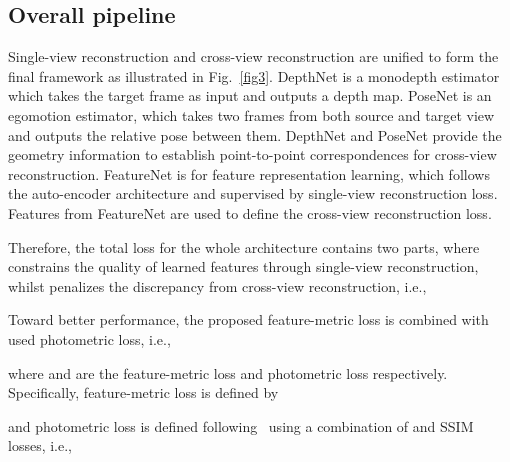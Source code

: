 \documentclass[runningheads]{llncs}
\begin{document}
\subsection{Overall pipeline}\label{sec34}
Single-view reconstruction and cross-view reconstruction are unified to form the final framework as illustrated in Fig.~\ref{fig3}. DepthNet is a monodepth estimator which takes the target frame as input and outputs a depth map. PoseNet is an egomotion estimator, which takes two frames from both source and target view and outputs the relative pose between them. DepthNet and PoseNet provide the geometry information to establish point-to-point correspondences for cross-view reconstruction. FeatureNet is for feature representation learning, which follows the auto-encoder architecture and supervised by single-view reconstruction loss. Features from FeatureNet are used to define the cross-view reconstruction loss.   

\iffalse
Single-view reconstruction and cross-view reconstruction are unified to form our final framework. 
Fig. \ref{fig3} shows an illustration of the overall process. 
The PoseNet is a pose estimator, which receives concatenation of two frames respectively from the source and target views and outputs the relative pose between them.
The DepthNet is a depth estimator, which takes the frame at the target view as input and outputs corresponding depth map. 
The FeatureNet is a network of auto-encoder architecture, we used for single-view reconstruction.
Its training is constrained by the single-view reconstruction loss to make sure feature maps from its encoder have promised properties.
During the training, the feature map extracted from the frame at the source view are warped to target view according to the depth and egomotion estimated by DepthNet and PoseNet.
The discrepancy between the synthesized feature map and target feature map will be evaluated as the feature-metric loss.
\fi


Therefore, the total loss for the whole architecture contains two parts, where  constrains the quality of learned features through single-view reconstruction, whilst  penalizes the discrepancy from cross-view reconstruction, i.e., 


Toward better performance, the proposed feature-metric loss is combined with used photometric loss, i.e.,

where  and  are the feature-metric loss and photometric loss respectively. Specifically, feature-metric loss is defined by

and photometric loss is defined following~\cite{monodepth} using a combination of  and SSIM
losses, i.e.,
\end{document}
